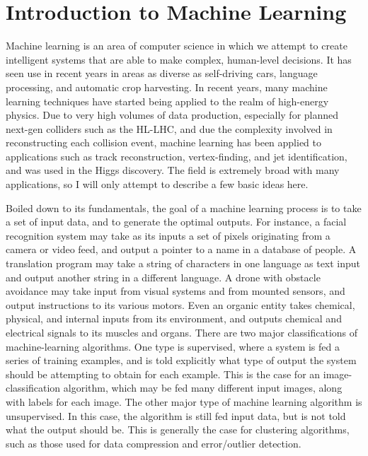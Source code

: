 \chapter{Introduction to Machine Learning}

Machine learning is an area of computer science in which we attempt to create intelligent systems that are able to make complex, human-level decisions. It has seen use in recent years in areas as diverse as self-driving cars, language processing, and automatic crop harvesting. In recent years, many machine learning techniques have started being applied to the realm of high-energy physics. Due to very high volumes of data production, especially for planned next-gen colliders such as the HL-LHC, and due the complexity involved in reconstructing each collision event, machine learning has been applied to applications such as track reconstruction, vertex-finding, and jet identification, and was used in the Higgs discovery. The field is extremely broad with many applications, so I will only attempt to describe a few basic ideas here.

Boiled down to its fundamentals, the goal of a machine learning process is  to take a set of input data, and to generate the optimal outputs. For instance, a facial recognition system may take as its inputs a set of pixels originating from a camera or video feed, and output a pointer to a name in a database of people. A translation program may take a string of characters in one language as text input and output another string in a different language. A drone with obstacle avoidance may take input from visual systems and from mounted sensors, and output instructions to its various motors. Even an organic entity takes chemical, physical, and internal inputs from its environment, and outputs chemical and electrical signals to its muscles and organs. There are two major classifications of machine-learning algorithms. One type is supervised, where a system is fed a series of training examples, and is told explicitly what type of output the system should be attempting to obtain for each example. This is the case for an image-classification algorithm, which may be fed many different input images, along with labels for each image. The other major type of machine learning algorithm is unsupervised. In this case, the algorithm is still fed input data, but is not told what the output should be. This is generally the case for clustering algorithms, such as those used for data compression and error/outlier detection.

